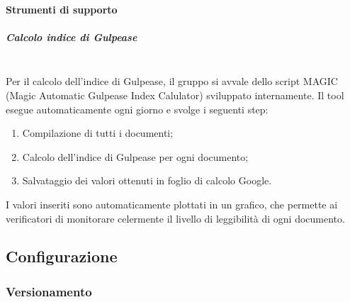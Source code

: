 \paragraph{Strumenti di supporto}
\subparagraph{Calcolo indice di Gulpease}\mbox{}\\
Per il calcolo dell'indice di Gulpease, il gruppo \gruppo \space si avvale dello script MAGIC (Magic Automatic Gulpease Index Calulator) sviluppato internamente.
Il tool esegue automaticamente ogni giorno e svolge i seguenti step:
\begin{enumerate}
	\item Compilazione di tutti i documenti;
	\item Calcolo dell'indice di Gulpease per ogni documento;
	\item Salvataggio dei valori ottenuti in foglio di calcolo Google.
\end{enumerate}
I valori inseriti sono automaticamente plottati in un grafico, che permette ai verificatori di monitorare celermente il livello di leggibilità di ogni documento.

\subsection{Configurazione}
\subsubsection{Versionamento}

